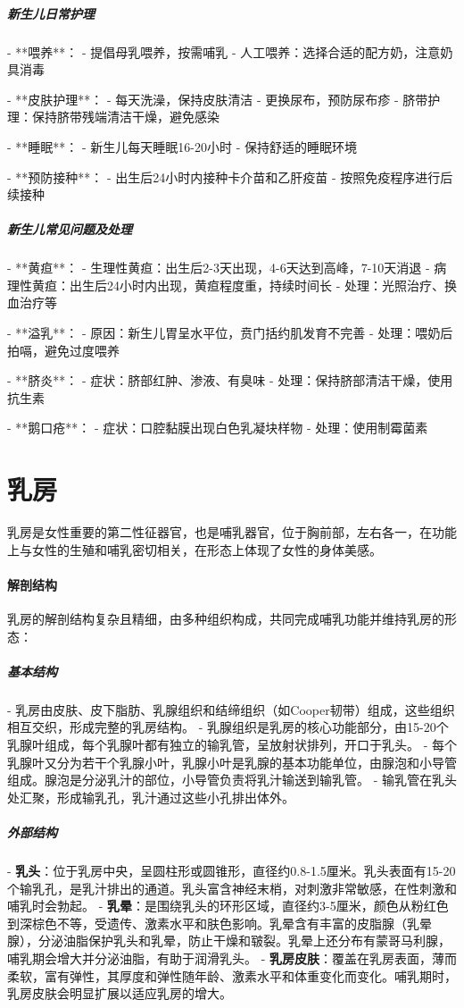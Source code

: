 \begin{enumerate}
\subparagraph{新生儿日常护理}

- **喂养**：
  - 提倡母乳喂养，按需哺乳
  - 人工喂养：选择合适的配方奶，注意奶具消毒

- **皮肤护理**：
  - 每天洗澡，保持皮肤清洁
  - 更换尿布，预防尿布疹
  - 脐带护理：保持脐带残端清洁干燥，避免感染

- **睡眠**：
  - 新生儿每天睡眠16-20小时
  - 保持舒适的睡眠环境

- **预防接种**：
  - 出生后24小时内接种卡介苗和乙肝疫苗
  - 按照免疫程序进行后续接种

\subparagraph{新生儿常见问题及处理}

- **黄疸**：
  - 生理性黄疸：出生后2-3天出现，4-6天达到高峰，7-10天消退
  - 病理性黄疸：出生后24小时内出现，黄疸程度重，持续时间长
  - 处理：光照治疗、换血治疗等

- **溢乳**：
  - 原因：新生儿胃呈水平位，贲门括约肌发育不完善
  - 处理：喂奶后拍嗝，避免过度喂养

- **脐炎**：
  - 症状：脐部红肿、渗液、有臭味
  - 处理：保持脐部清洁干燥，使用抗生素

- **鹅口疮**：
  - 症状：口腔黏膜出现白色乳凝块样物
  - 处理：使用制霉菌素

\section{乳房}

乳房是女性重要的第二性征器官，也是哺乳器官，位于胸前部，左右各一，在功能上与女性的生殖和哺乳密切相关，在形态上体现了女性的身体美感。

\paragraph{解剖结构}

乳房的解剖结构复杂且精细，由多种组织构成，共同完成哺乳功能并维持乳房的形态：

\subparagraph{基本结构}
- 乳房由皮肤、皮下脂肪、乳腺组织和结缔组织（如Cooper韧带）组成，这些组织相互交织，形成完整的乳房结构。
- 乳腺组织是乳房的核心功能部分，由15-20个乳腺叶组成，每个乳腺叶都有独立的输乳管，呈放射状排列，开口于乳头。
- 每个乳腺叶又分为若干个乳腺小叶，乳腺小叶是乳腺的基本功能单位，由腺泡和小导管组成。腺泡是分泌乳汁的部位，小导管负责将乳汁输送到输乳管。
- 输乳管在乳头处汇聚，形成输乳孔，乳汁通过这些小孔排出体外。

\subparagraph{外部结构}
- \textbf{乳头}：位于乳房中央，呈圆柱形或圆锥形，直径约0.8-1.5厘米。乳头表面有15-20个输乳孔，是乳汁排出的通道。乳头富含神经末梢，对刺激非常敏感，在性刺激和哺乳时会勃起。
- \textbf{乳晕}：是围绕乳头的环形区域，直径约3-5厘米，颜色从粉红色到深棕色不等，受遗传、激素水平和肤色影响。乳晕含有丰富的皮脂腺（乳晕腺），分泌油脂保护乳头和乳晕，防止干燥和皲裂。乳晕上还分布有蒙哥马利腺，哺乳期会增大并分泌油脂，有助于润滑乳头。
- \textbf{乳房皮肤}：覆盖在乳房表面，薄而柔软，富有弹性，其厚度和弹性随年龄、激素水平和体重变化而变化。哺乳期时，乳房皮肤会明显扩展以适应乳房的增大。


\end{enumerate}
